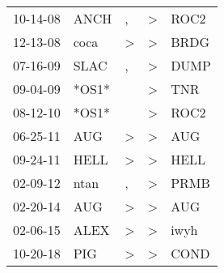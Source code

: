 \begin{supertabular}{lllll}
 10-14-08 &   ANCH &             , &  \textgreater &  ROC2 \\
 12-13-08 &   coca &  \textgreater &  \textgreater &  BRDG \\
 07-16-09 &   SLAC &             , &  \textgreater &  DUMP \\
 09-04-09 &  *OS1* &               &  \textgreater &   TNR \\
 08-12-10 &  *OS1* &               &  \textgreater &  ROC2 \\
 06-25-11 &    AUG &  \textgreater &  \textgreater &   AUG \\
 09-24-11 &   HELL &  \textgreater &  \textgreater &  HELL \\
 02-09-12 &   ntan &             , &  \textgreater &  PRMB \\
 02-20-14 &    AUG &  \textgreater &  \textgreater &   AUG \\
 02-06-15 &   ALEX &  \textgreater &  \textgreater &  iwyh \\
 10-20-18 &    PIG &  \textgreater &  \textgreater &  COND \\
\end{supertabular}
